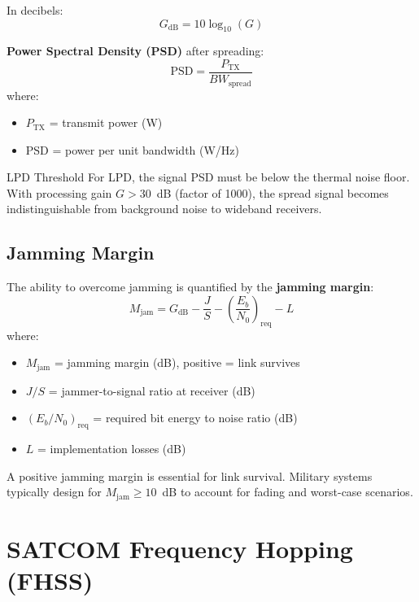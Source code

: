 In decibels:
\begin{equation}
G_{\text{dB}} = 10 \log_{10}(G)
\end{equation}

\textbf{Power Spectral Density (PSD)} after spreading:
\begin{equation}
\text{PSD} = \frac{P_{\text{TX}}}{BW_{\text{spread}}}
\end{equation}
where:
\begin{itemize}
\item $P_{\text{TX}}$ = transmit power (W)
\item PSD = power per unit bandwidth (W/Hz)
\end{itemize}

\begin{calloutbox}{LPD Threshold}
For LPD, the signal PSD must be below the thermal noise floor. With processing gain $G > 30$~dB (factor of 1000), the spread signal becomes indistinguishable from background noise to wideband receivers.
\end{calloutbox}

\subsection{Jamming Margin}

The ability to overcome jamming is quantified by the \textbf{jamming margin}:
\begin{equation}
M_{\text{jam}} = G_{\text{dB}} - \frac{J}{S} - \left(\frac{E_b}{N_0}\right)_{\text{req}} - L
\end{equation}
where:
\begin{itemize}
\item $M_{\text{jam}}$ = jamming margin (dB), positive = link survives
\item $J/S$ = jammer-to-signal ratio at receiver (dB)
\item $(E_b/N_0)_{\text{req}}$ = required bit energy to noise ratio (dB)
\item $L$ = implementation losses (dB)
\end{itemize}

\begin{warningbox}
A positive jamming margin is essential for link survival. Military systems typically design for $M_{\text{jam}} \geq 10$~dB to account for fading and worst-case scenarios.
\end{warningbox}

\section{SATCOM Frequency Hopping (FHSS)}


